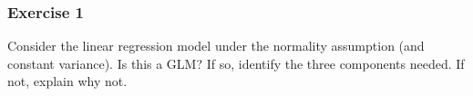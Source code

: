 \documentclass{beamer}
\begin{document}
%
%
%

\begin{frame}
\frametitle{Exercise 1}

Consider the linear regression model under the normality assumption (and constant variance). Is this a GLM? If so, identify the three components needed. If not, explain why not.

\end{frame}
\end{document}
